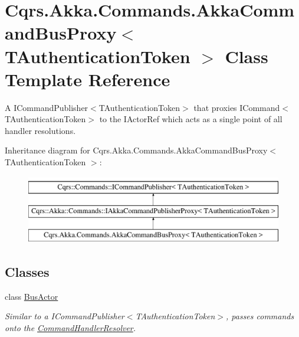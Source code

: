 \hypertarget{classCqrs_1_1Akka_1_1Commands_1_1AkkaCommandBusProxy}{}\section{Cqrs.\+Akka.\+Commands.\+Akka\+Command\+Bus\+Proxy$<$ T\+Authentication\+Token $>$ Class Template Reference}
\label{classCqrs_1_1Akka_1_1Commands_1_1AkkaCommandBusProxy}


A I\+Command\+Publisher$<$\+T\+Authentication\+Token$>$ that proxies I\+Command$<$\+T\+Authentication\+Token$>$ to the I\+Actor\+Ref which acts as a single point of all handler resolutions.  


Inheritance diagram for Cqrs.\+Akka.\+Commands.\+Akka\+Command\+Bus\+Proxy$<$ T\+Authentication\+Token $>$\+:\begin{figure}[H]
\begin{center}
\leavevmode
\includegraphics[height=3.000000cm]{classCqrs_1_1Akka_1_1Commands_1_1AkkaCommandBusProxy}
\end{center}
\end{figure}
\subsection*{Classes}
\begin{DoxyCompactItemize}
\item 
class \hyperlink{classCqrs_1_1Akka_1_1Commands_1_1AkkaCommandBusProxy_1_1BusActor}{Bus\+Actor}
\begin{DoxyCompactList}\small\item\em Similar to a I\+Command\+Publisher$<$\+T\+Authentication\+Token$>$, passes commands onto the \hyperlink{classCqrs_1_1Akka_1_1Commands_1_1AkkaCommandBusProxy_1_1BusActor_a097e43f25d55e632c2c5da9d0255d180_a097e43f25d55e632c2c5da9d0255d180}{Command\+Handler\+Resolver}. \end{DoxyCompactList}\end{DoxyCompactItemize}
